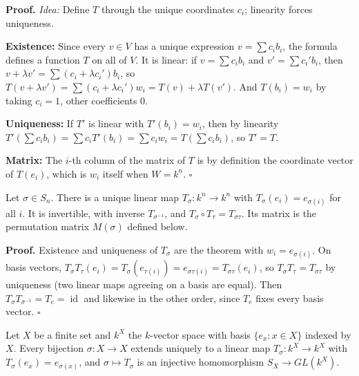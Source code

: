 \documentclass[11pt]{report}
\renewenvironment{proof}[1][Proof]{\noindent\textbf{#1.} }{\hfill$\square$\par\vspace{5pt}}
\begin{document}
\begin{proof}
\textit{Idea:} Define $T$ through the unique coordinates $c_i$; linearity forces uniqueness.\par
\textbf{Existence:} Since every $v \in V$ has a unique expression $v = \sum c_i b_i$, the formula defines a function $T$ on all of $V$. It is linear: if $v = \sum c_i b_i$ and $v' = \sum c_i' b_i$, then $v + \lambda v' = \sum (c_i + \lambda c_i') b_i$, so $T(v + \lambda v') = \sum (c_i + \lambda c_i') w_i = T(v) + \lambda T(v')$. And $T(b_i) = w_i$ by taking $c_i = 1$, other coefficients $0$.

\textbf{Uniqueness:} If $T'$ is linear with $T'(b_i) = w_i$, then by linearity $T'(\sum c_i b_i) = \sum c_i T'(b_i) = \sum c_i w_i = T(\sum c_i b_i)$, so $T' = T$.

\textbf{Matrix:} The $i$-th column of the matrix of $T$ is by definition the coordinate vector of $T(e_i)$, which is $w_i$ itself when $W = k^n$.
\end{proof}

\begin{corbox}\label{cor:permutations-basis-give-invertible-linear-maps}
Let $\sigma \in S_n$. There is a unique linear map $T_\sigma: k^n \to k^n$ with $T_\sigma(e_i) = e_{\sigma(i)}$ for all $i$. It is invertible, with inverse $T_{\sigma^{-1}}$, and $T_\sigma \circ T_\tau = T_{\sigma\tau}$. Its matrix is the permutation matrix $M(\sigma)$ defined below.
\end{corbox}

\begin{proof}
Existence and uniqueness of $T_\sigma$ are the theorem with $w_i = e_{\sigma(i)}$. On basis vectors, $T_\sigma T_\tau (e_i) = T_\sigma(e_{\tau(i)}) = e_{\sigma\tau(i)} = T_{\sigma\tau}(e_i)$, so $T_\sigma T_\tau = T_{\sigma\tau}$ by uniqueness (two linear maps agreeing on a basis are equal). Then $T_\sigma T_{\sigma^{-1}} = T_{e} = \operatorname{id}$ and likewise in the other order, since $T_e$ fixes every basis vector.
\end{proof}

\begin{propbox}\label{prop:permutation-representation-sx}
Let $X$ be a finite set and $k^X$ the $k$-vector space with basis $\{e_x : x \in X\}$ indexed by $X$. Every bijection $\sigma: X \to X$ extends uniquely to a linear map $T_\sigma: k^X \to k^X$ with $T_\sigma(e_x) = e_{\sigma(x)}$, and $\sigma \mapsto T_\sigma$ is an injective homomorphism $S_X \to GL(k^X)$.
\end{propbox}
\end{document}
